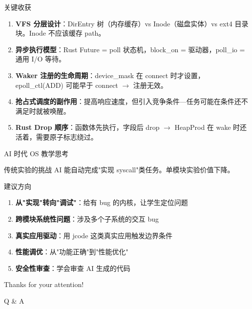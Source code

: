 \documentclass{beamer}
\begin{document}
\begin{frame}{关键收获}
  \begin{enumerate}
    \setlength{\itemsep}{6pt}
    \item \textbf{VFS 分层设计}：DirEntry 树（内存缓存）vs Inode（磁盘实体）vs ext4 目录块。Inode 不应该缓存 path。
    \item \textbf{异步执行模型}：Rust Future = poll 状态机，block\_on = 驱动器，poll\_io = 通用 I/O 等待。
    \item \textbf{Waker 注册的生命周期}：device\_mask 在 connect 时才设置，epoll\_ctl(ADD) 可能早于 connect $\to$ 注册无效。
    \item \textbf{抢占式调度的副作用}：提高响应速度，但引入竞争条件---任务可能在条件还不满足时就被唤醒。
    \item \textbf{Rust Drop 顺序}：函数体先执行，字段后 drop $\to$ HeapProd 在 wake 时还活着，需要原子标志绕过。
  \end{enumerate}
\end{frame}


\begin{frame}{AI 时代 OS 教学思考}
  \begin{block}{传统实验的挑战}
    AI 能自动完成"实现 syscall"类任务。单模块实验价值下降。
  \end{block}
  \begin{block}{建议方向}
    \begin{enumerate}
      \setlength{\itemsep}{4pt}
      \item \textbf{从"实现"转向"调试"}：给有 bug 的内核，让学生定位问题
      \item \textbf{跨模块系统性问题}：涉及多个子系统的交互 bug
      \item \textbf{真实应用驱动}：用 jcode 这类真实应用触发边界条件
      \item \textbf{性能调优}：从"功能正确"到"性能优化"
      \item \textbf{安全性审查}：学会审查 AI 生成的代码
    \end{enumerate}
  \end{block}
\end{frame}

\begin{frame}
  \begin{center}
    {\Huge\calligra Thanks for your attention!}
    \vspace{1cm}

    {\Huge Q \& A}
  \end{center}
\end{frame}
\end{document}

